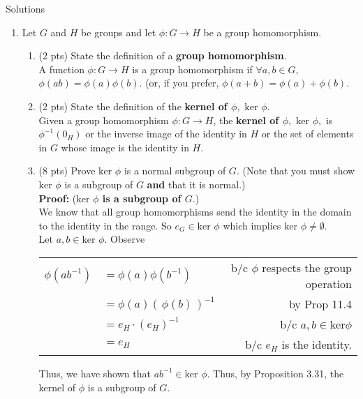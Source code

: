 \documentclass[12pt]{article}
\renewcommand{\emph}[1]{\textsf{\textbf{#1}}}
\begin{document}
\begin{center}{\Large{Solutions}}\end{center}
\begin{enumerate}
\item Let $G$ and $H$ be groups and let $\phi: G \to H$ be a group homomorphism.
	\begin{enumerate}
	\item ({\small 2 pts}) State the definition of a \emph{group homomorphism}.\\
	
	A function $\phi: G \to H$ is a group homomorphism if $\forall a,b \in G,$
	 $\phi(ab)=\phi (a) \phi(b).$ (or, if you prefer, $\phi(a+b)=\phi (a) + \phi(b).$ \\
	\vfill
	\item ({\small 2 pts}) State the definition of the \emph{kernel of $\phi,$} $\text{ker } \phi.$ \\
	
	Given a group homomorphism $\phi: G \to H$, the \emph{kernel of $\phi,$} $\text{ker } \phi,$ is $\phi^{-1}(0_H)$ or the inverse image of the identity in $H$ or the set of elements in $G$ whose image is the identity in $H.$\\
	\vfill
	\item ({\small 8 pts}) Prove $\text{ker }\phi$ is a normal subgroup of $G.$ (Note that you must show $\text{ker }\phi$ is a subgroup of $G$ \emph{and} that it is normal.)\\
	
	\textbf{Proof:} (\textbf{$\text{ker }\phi$ is a subgroup of $G.$})\\
	We know that all group  homomorphisms send the identity in the domain to the identity in the range. So $e_G \in \text{ker }\phi$ which implies  $\text{ker }\phi \not = \emptyset.$\\
	Let $a,b \in \text{ker }\phi.$ Observe \\
	\begin{tabular}{rlr}
	$\phi(ab^{-1})$&$=\phi(a)\phi(b^{-1})$& b/c $\phi$ respects the group operation\\
	&$=\phi(a)( \, \phi(b)\,)^{-1}$& by Prop 11.4\\
	&$=e_H\cdot (e_H)^{-1}$& b/c $a,b \in \text{ker}\phi$\\
	&$=e_H$& b/c $e_H$ is the identity.\\
	\end{tabular}
	
	Thus, we have shown that $ab^{-1} \in \text{ker }\phi.$ Thus, by Proposition 3.31, the kernel of $\phi$ is a subgroup of $G.$
	

\end{enumerate}
\end{enumerate}
\end{document}
